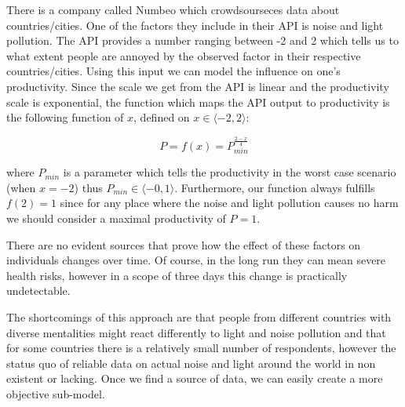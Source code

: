 There is a company called Numbeo which crowdsourseces data about countries/cities. One of the factors they include in their API is noise and light pollution. The API provides a number ranging between -2 and 2 which tells us to what extent people are annoyed by the observed factor in their respective countries/cities. Using this input we can model the influence on one's productivity. Since the scale we get from the API is linear and the productivity scale is exponential, the function which maps the API output to productivity is the following function of $x$, defined on $ x\in \langle -2,2\rangle$:

$$P = f(x) = P_{min}^{\frac{2-x}{4}}$$

\noindent where $P_{min}$ is a parameter which tells the productivity in the worst case scenario  (when $x=-2$) thus $ P_{min}\in \langle -0,1\rangle$. Furthermore, our function always fulfills $f(2) = 1$ since for any place where the noise and light pollution causes no harm we should consider a maximal productivity of $P = 1$.


There are no evident sources that prove how the effect of these factors on individuals changes over time. Of course, in the long run they can mean severe health risks, however in a scope of three days this change is practically undetectable.

The shortcomings of this approach are that people from different countries with diverse mentalities might react differently to light and noise pollution and that for some countries there is a relatively small number of respondents, however the status quo of reliable data on actual noise and light around the world in non existent or lacking. Once we find a source of data, we can easily create a more objective sub-model.





